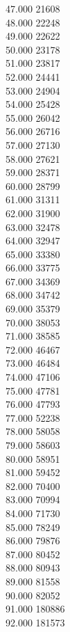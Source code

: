 { 47.000	21608 \\
 48.000	22248 \\
 49.000	22622 \\
 50.000	23178 \\
 51.000	23817 \\
 52.000	24441 \\
 53.000	24904 \\
 54.000	25428 \\
 55.000	26042 \\
 56.000	26716 \\
 57.000	27130 \\
 58.000	27621 \\
 59.000	28371 \\
 60.000	28799 \\
 61.000	31311 \\
 62.000	31900 \\
 63.000	32478 \\
 64.000	32947 \\
 65.000	33380 \\
 66.000	33775 \\
 67.000	34369 \\
 68.000	34742 \\
 69.000	35379 \\
 70.000	38053 \\
 71.000	38585 \\
 72.000	46467 \\
 73.000	46484 \\
 74.000	47106 \\
 75.000	47781 \\
 76.000	47793 \\
 77.000	52238 \\
 78.000	58058 \\
 79.000	58603 \\
 80.000	58951 \\
 81.000	59452 \\
 82.000	70400 \\
 83.000	70994 \\
 84.000	71730 \\
 85.000	78249 \\
 86.000	79876 \\
 87.000	80452 \\
 88.000	80943 \\
 89.000	81558 \\
 90.000	82052 \\
 91.000	180886 \\
 92.000	181573 \\
}
